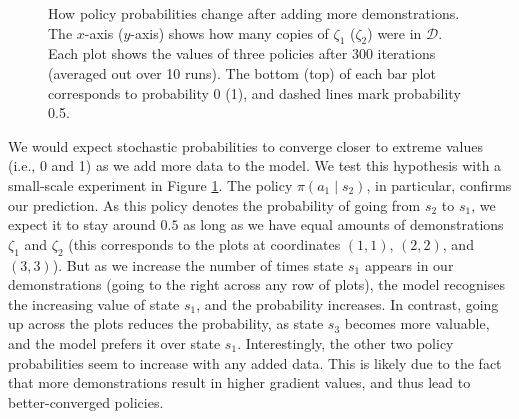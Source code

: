 \documentclass{mpaper}
\newcommand{\pione}{\pi(a_1 \mid s_1)}
\newcommand{\pitwo}{\pi(a_1 \mid s_2)}
\newcommand{\pithree}{\pi(a_2 \mid s_3)}
\begin{document}
\begin{figure}
  \centering
  \caption{How policy probabilities change after adding more demonstrations. The
    $x$-axis ($y$-axis) shows how many copies of $\zeta_1$ ($\zeta_2$) were in
    $\mathcal{D}$. Each plot shows the values of three policies after 300
    iterations (averaged out over 10 runs). The bottom (top) of each bar plot
    corresponds to probability 0 (1), and dashed lines mark probability 0.5.}
  \label{fig:policies}
\end{figure}

We would expect stochastic probabilities to converge closer to extreme
values (i.e., 0 and 1) as we add more data to the model. We test this hypothesis
with a small-scale experiment in Figure \ref{fig:policies}. The policy $\pitwo$,
in particular, confirms our prediction. As this policy denotes the probability
of going from $s_2$ to $s_1$, we expect it to stay around $0.5$ as long as we
have equal amounts of demonstrations $\zeta_1$ and $\zeta_2$ (this corresponds
to the plots at coordinates $(1, 1)$, $(2, 2)$, and $(3, 3)$). But as we
increase the number of times state $s_1$ appears in our demonstrations (going
to the right across any row of plots), the model recognises the increasing value
of state $s_1$, and the probability increases. In contrast, going up across the
plots reduces the probability, as state $s_3$ becomes more valuable, and the
model prefers it over state $s_1$. Interestingly, the other two policy
probabilities seem to increase with any added data. This is likely due to the
fact that more demonstrations result in higher gradient values, and thus lead to
better-converged policies.
\end{document}
